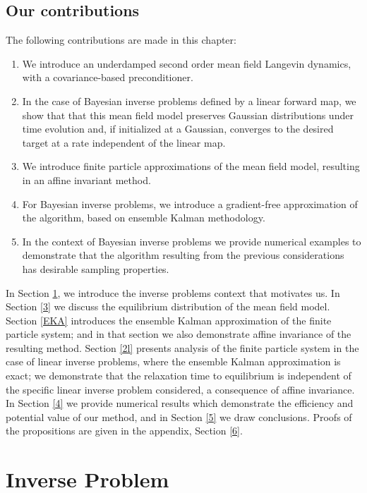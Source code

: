 \documentclass[12pt]{caltech_thesis}
\numberwithin{equation}{section}
\begin{document}
     
     
\subsection{Our contributions}
\label{ssec:con}
The following contributions are made in this chapter:
\begin{enumerate}
    \item We introduce an underdamped second order mean field Langevin dynamics, with a covariance-based preconditioner. 
    \item {In the case of {Bayesian inverse problems defined by}
    a linear forward map, we show that 
    that {this mean field model} preserves Gaussian distributions under time evolution and, if initialized at
    a Gaussian, converges to the desired target at {a} rate independent of the linear map.}
    \item {We introduce finite particle approximations of the mean field model, resulting in an affine invariant method.}
    \item For {Bayesian inverse problems}, we introduce a gradient-free approximation of the algorithm, based on ensemble Kalman methodology.
    \item {In the context of {Bayesian inverse problems} we provide numerical examples to demonstrate that the algorithm resulting
    from the previous considerations has desirable sampling properties.}
\end{enumerate}

In Section \ref{2}, we introduce the inverse problems context that motivates us.
In Section \ref{3} we discuss the equilibrium distribution of the mean field
model.
Section \ref{EKA} introduces the ensemble Kalman approximation of the
finite particle system; {and in that section we also
demonstrate affine invariance of the resulting method.} Section \ref{2l} presents analysis of the finite particle system in the case of linear inverse problems, where the ensemble Kalman approximation is exact; we demonstrate
that the relaxation time to equilibrium is independent of the specific linear inverse
problem considered, a consequence of affine invariance. In Section \ref{4} we provide numerical results which demonstrate the efficiency and potential value of our method, 
and in Section \ref{5} we draw conclusions. Proofs of the propositions are given in the appendix, Section \ref{6}.

\section{Inverse Problem}\label{2}
\end{document}
